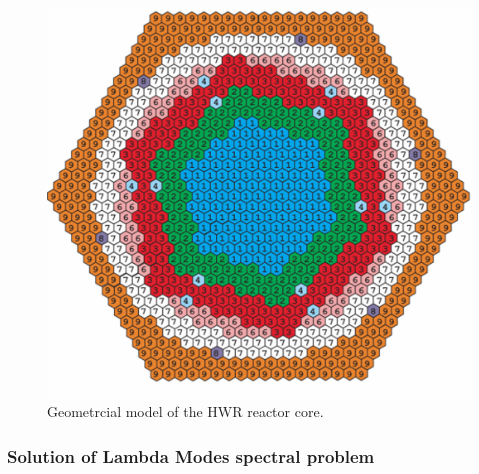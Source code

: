 \documentclass[authoryear]{elsarticle}
\begin{document}
\begin{figure}[hp]
	\begin{center}
    		\includegraphics[width=0.9\linewidth] {hwr.png}
		\caption{Geometrcial model of the HWR reactor core.}
		\label{fig:hwr}
	\end{center}
\end{figure} 

\subsubsection{Solution of Lambda Modes spectral problem}
\end{document}
